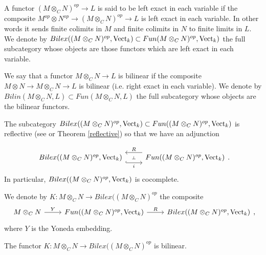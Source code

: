 \begin{definition}

  \noindent A functor $(M\otimes_C N)^{op}\to L$ is said to be left exact in
  each variable if the composite $M^{op}\otimes N^{op}\to (M\otimes_C
  N)^{op}\to L$ is left exact in each variable. In other words it sends finite
  colimits in $M$ and finite colimits in $N$ to finite limits in $L$. We
  denote by $Bilex((M\otimes_C N)^{op},\operatorname{Vect}_k)\subset Fun(M\otimes_C
  N)^{op},\operatorname{Vect}_k)$ the full subcategory whose objects are those functors
  which are left exact in each variable.
\end{definition}

\begin{definition}

  \noindent We say that a functor $M\otimes_C N \to L$ is bilinear if the
  composite $M\otimes N\to M\otimes_C N \to L$ is bilinear (i.e. right exact
  in each variable). We denote by $Bilin(M\otimes_C N, L)\subset
  Fun(M\otimes_C N, L)$ the full subcategory whose objects are the bilinear
  functors.
\end{definition}

The subcategory $Bilex((M\otimes_C N)^{op},\operatorname{Vect}_k)\subset Fun((M\otimes_C
N)^{op},\operatorname{Vect}_k)$ is reflective (see \cite[Theorem
  6.5]{kelly/basic-concepts-enriched} or Theorem \ref{reflective}) so that we
have an adjunction

\[\begin{tikzcd}
            {Bilex((M\otimes_C N)^{op},\Vect_k)} & {Fun((M\otimes_C N)^{op},\Vect_k)}
            \arrow[""{name=0, anchor=center, inner sep=0}, "i"', shift right=3, hook, from=1-1, to=1-2]
            \arrow[""{name=1, anchor=center, inner sep=0}, "R"', shift right=3, from=1-2, to=1-1]
            \arrow["\dashv"{anchor=center, rotate=-90}, draw=none, from=1, to=0]
\end{tikzcd}.\]
In particular, $Bilex((M\otimes_C N)^{op},\operatorname{Vect}_k)$ is cocomplete.

\begin{definition}\label{def_K}

  \noindent We denote by $K:M\otimes_C N\to Bilex((M\otimes_C N)^{op}$ the composite
  \[
  \begin{tikzcd}
    {M\otimes_C N} & {Fun((M\otimes_C N)^{op},\Vect_k)} & {Bilex((M\otimes_C N)^{op},\Vect_k)}
    \arrow["Y", from=1-1, to=1-2]
    \arrow["R", from=1-2, to=1-3]
  \end{tikzcd},
  \]
  where $Y$ is the Yoneda embedding.\end{definition}
\begin{lemma}\label{right_exact_0}

The functor $K:M\otimes_C N\to Bilex((M\otimes_C N)^{op}$ is bilinear.\end{lemma}

